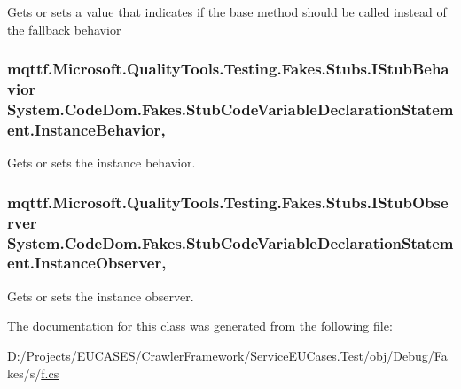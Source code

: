 Gets or sets a value that indicates if the base method should be called instead of the fallback behavior

\hypertarget{class_system_1_1_code_dom_1_1_fakes_1_1_stub_code_variable_declaration_statement_a0abb4546ceefab701d51fa9f9bc96b4d}{
\subsubsection[{Instance\-Behavior}]{\setlength{\rightskip}{0pt plus 5cm}mqttf.\-Microsoft.\-Quality\-Tools.\-Testing.\-Fakes.\-Stubs.\-I\-Stub\-Behavior System.\-Code\-Dom.\-Fakes.\-Stub\-Code\-Variable\-Declaration\-Statement.\-Instance\-Behavior\hspace{0.3cm}{\ttfamily [get]}, {\ttfamily [set]}}}\label{class_system_1_1_code_dom_1_1_fakes_1_1_stub_code_variable_declaration_statement_a0abb4546ceefab701d51fa9f9bc96b4d}


Gets or sets the instance behavior.

\hypertarget{class_system_1_1_code_dom_1_1_fakes_1_1_stub_code_variable_declaration_statement_a6de08cbd7772c8cd33333b48bb1e488b}{
\subsubsection[{Instance\-Observer}]{\setlength{\rightskip}{0pt plus 5cm}mqttf.\-Microsoft.\-Quality\-Tools.\-Testing.\-Fakes.\-Stubs.\-I\-Stub\-Observer System.\-Code\-Dom.\-Fakes.\-Stub\-Code\-Variable\-Declaration\-Statement.\-Instance\-Observer\hspace{0.3cm}{\ttfamily [get]}, {\ttfamily [set]}}}\label{class_system_1_1_code_dom_1_1_fakes_1_1_stub_code_variable_declaration_statement_a6de08cbd7772c8cd33333b48bb1e488b}


Gets or sets the instance observer.



The documentation for this class was generated from the following file\-:\begin{DoxyCompactItemize}
\item 
D\-:/\-Projects/\-E\-U\-C\-A\-S\-E\-S/\-Crawler\-Framework/\-Service\-E\-U\-Cases.\-Test/obj/\-Debug/\-Fakes/s/\hyperlink{s_2f_8cs}{f.\-cs}\end{DoxyCompactItemize}
